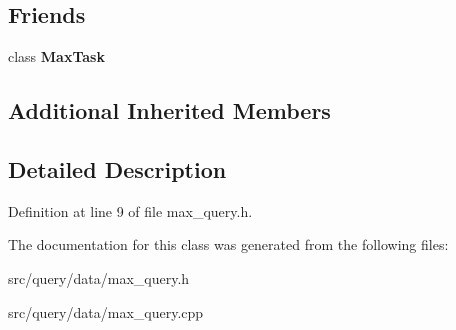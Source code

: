 \subsection*{Friends}
\begin{DoxyCompactItemize}
\item 
\mbox{\label{class_max_query_ac21f840d0c21da4f1f1fa4086450ebaf}} 
class {\bfseries Max\+Task}
\end{DoxyCompactItemize}
\subsection*{Additional Inherited Members}


\subsection{Detailed Description}


Definition at line 9 of file max\+\_\+query.\+h.



The documentation for this class was generated from the following files\+:\begin{DoxyCompactItemize}
\item 
src/query/data/max\+\_\+query.\+h\item 
src/query/data/max\+\_\+query.\+cpp\end{DoxyCompactItemize}

